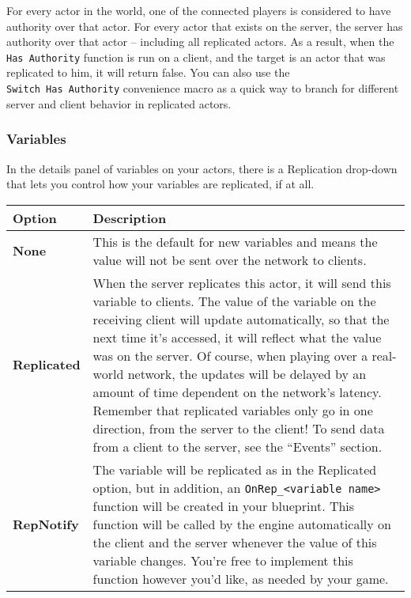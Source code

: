 \documentclass[
  letterpaper,
  DIV=11,
  numbers=noendperiod]{scrartcl}
\begin{document}
For every actor in the world, one of the connected players is considered
to have authority over that actor. For every actor that exists on the
server, the server has authority over that actor -- including all
replicated actors. As a result, when the \texttt{Has\ Authority}
function is run on a client, and the target is an actor that was
replicated to him, it will return false. You can also use the
\texttt{Switch\ Has\ Authority} convenience macro as a quick way to
branch for different server and client behavior in replicated actors.

\subsubsection{Variables}\label{variables}

In the details panel of variables on your actors, there is a Replication
drop-down that lets you control how your variables are replicated, if at
all.

\begin{longtable}[]{@{}
  >{\raggedright\arraybackslash}p{}
  >{\raggedright\arraybackslash}p{}@{}}
\toprule\noalign{}
\begin{minipage}[b]{\linewidth}\raggedright
Option
\end{minipage} & \begin{minipage}[b]{\linewidth}\raggedright
Description
\end{minipage} \\
\midrule\noalign{}
\endhead
\bottomrule\noalign{}
\endlastfoot
\textbf{None} & This is the default for new variables and means the
value will not be sent over the network to clients. \\
\textbf{Replicated} & When the server replicates this actor, it will
send this variable to clients. The value of the variable on the
receiving client will update automatically, so that the next time it's
accessed, it will reflect what the value was on the server. Of course,
when playing over a real-world network, the updates will be delayed by
an amount of time dependent on the network's latency. Remember that
replicated variables only go in one direction, from the server to the
client! To send data from a client to the server, see the ``Events''
section. \\
\textbf{RepNotify} & The variable will be replicated as in the
Replicated option, but in addition, an
\texttt{OnRep\_\textless{}variable\ name\textgreater{}} function will be
created in your blueprint. This function will be called by the engine
automatically on the client and the server whenever the value of this
variable changes. You're free to implement this function however you'd
like, as needed by your game. \\
\end{longtable}
\end{document}
